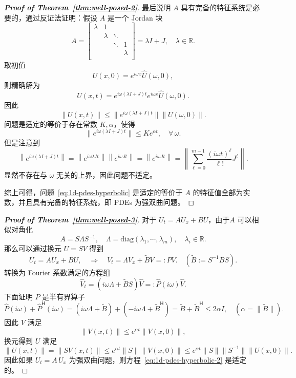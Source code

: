 \begin{proof}[\normalfont\bfseries Proof of Theorem~\ref{thm:well-posed-2}]
    最后说明 $A$ 具有完备的特征系统是必要的，通过反证法证明：假设 $A$ 是一个 Jordan 块
    \[
        A = \begin{bmatrix}
            \lambda & 1       &        &         \\
                    & \lambda & \ddots &         \\
                    &         & \ddots & 1       \\
                    &         &        & \lambda \\
        \end{bmatrix}
        = \lambda I + J,\quad \lambda \in \mathbb{R}.
    \]
    取初值
    \[
        U(x,0) = e^{i \omega x} \widehat{U}(\omega,0),
    \]
    则精确解为
    \[
        U(x,t) =  e^{i \omega (\lambda I + J) t} e^{i \omega x} \widehat{U}(\omega,0).
    \]
    因此
    \[
        \|U(x,t)\| \le \|e^{i \omega (\lambda I + J) t}\| \|U(\omega,0)\|.
    \]
    问题是适定的等价于存在常数 $K,\alpha$，使得
    \[
        \|e^{i \omega (\lambda I + J) t}\| \le K e^{\alpha t},\quad \forall\,\omega.
    \]
    但是注意到
    \[
        \left\| e^{i \omega (\lambda I + J) t} \right\|
        = \left\| e^{i \omega \lambda I t} \right\| \left\| e^{i \omega J t} \right\|
        = \left\| e^{i \omega J t} \right\|
        = \left\|
        \sum_{\ell=0}^{m-1} \frac{(i \omega t)^{\ell}}{\ell!} J^{\ell}
        \right\|.
    \]
    显然不存在与 $\omega$ 无关的上界，因此问题不适定。

    综上可得，问题~\eqref{eq:1d-pdes-hyperbolic} 是适定的等价于 $A$ 的特征值全部为实数，并且具有完备的特征系统，即 PDEs 为强双曲问题。
\end{proof}

\begin{proof}[\normalfont\bfseries Proof of Theorem~\ref{thm:well-posed-3}]
    对于 $U_t = A U_x + B U$，由于$A$ 可以相似对角化
    \[
        A = S \Lambda S^{-1},\quad \Lambda = \text{diag}(\lambda_1, \cdots, \lambda_m),\quad \lambda_i \in \mathbb{R}.
    \]
    那么可以通过换元 $U = S V$ 得到
    \[
        U_t = A U_x + B U, \quad \Rightarrow \quad V_t = \Lambda V_x + \widetilde{B} V =: P V.\quad (\widetilde{B} := S^{-1} B S).
    \]
    转换为 Fourier 系数满足的方程组
    \[
        \widehat{V}_t = (i \omega \Lambda + \widetilde{B} S) \widehat{V} =: \widehat{P}(i \omega) \widehat{V}.
    \]
    下面证明 $P$ 是半有界算子
    \[
        \widehat{P}(i \omega) + \widehat{P}^\mathsf{H}(i \omega)
        = (i \omega \Lambda + \widetilde{B}) + (- i \omega \Lambda + \widetilde{B}^\mathsf{H})
        = \widetilde{B} + \widetilde{B}^\mathsf{H}
        \le 2 \alpha I,\quad (\alpha = \|\widetilde{B}\|).
    \]
    因此 $V$ 满足
    \[
        \| V(x,t) \| \le e^{\alpha t} \| V(x,0) \|,
    \]
    换元得到 $U$ 满足
    \[
        \| U(x,t) \| = \| S V(x,t) \| \le e^{\alpha t}  \| S \| \| V(x,0) \|
        \le e^{\alpha t}  \| S \| \| S^{-1} \| \| U(x,0) \|.
    \]
    因此如果 $U_t = A\,U_x$ 为强双曲问题，则方程~\eqref{eq:1d-pdes-hyperbolic-2} 是适定的。
\end{proof}

